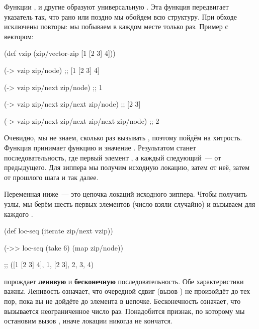 
Функции ,  и другие образуют универсальную . Эта
функция передвигает указатель так, что рано или поздно мы обойдем всю
структуру. При обходе исключены повторы: мы побываем в каждом месте только
раз. Пример с вектором:

\begin{english}
  \begin{clojure}
(def vzip
  (zip/vector-zip [1 [2 3] 4]))

(-> vzip zip/node)
;; [1 [2 3] 4]

(-> vzip zip/next zip/node)
;; 1

(-> vzip zip/next zip/next zip/node)
;; [2 3]

(-> vzip zip/next zip/next zip/next zip/node)
;; 2
  \end{clojure}
\end{english}

Очевидно, мы не знаем, сколько раз вызывать , поэтому пойдём на
хитрость. Функция  принимает функцию  и значение . Результатом
станет последовательность, где первый элемент , а каждый следующий~--- 
от предыдущего. Для зиппера мы получим исходную локацию, затем  от
неё, затем  от прошлого шага и так далее.

Переменная  ниже~--- это цепочка локаций исходного зиппера. Чтобы
получить узлы, мы берём шесть первых элементов (число взяли случайно) и вызываем
для каждого .

\begin{english}
  \begin{clojure}
(def loc-seq
  (iterate zip/next vzip))

(->> loc-seq
     (take 6)
     (map zip/node))

;; ([1 [2 3] 4], 1, [2 3], 2, 3, 4)
  \end{clojure}
\end{english}

 порождает \textbf{ленивую} и \textbf{бесконечную}
последовательность. Обе характеристики важны. Ленивость означает, что очередной
сдвиг (вызов ) не произойдёт до тех пор, пока вы не дойдёте до
элемента в цепочке. Бесконечность означает, что  вызывается
неограниченное число раз. Понадобится признак, по которому мы остановим вызов
, иначе локации никогда не кончатся.

